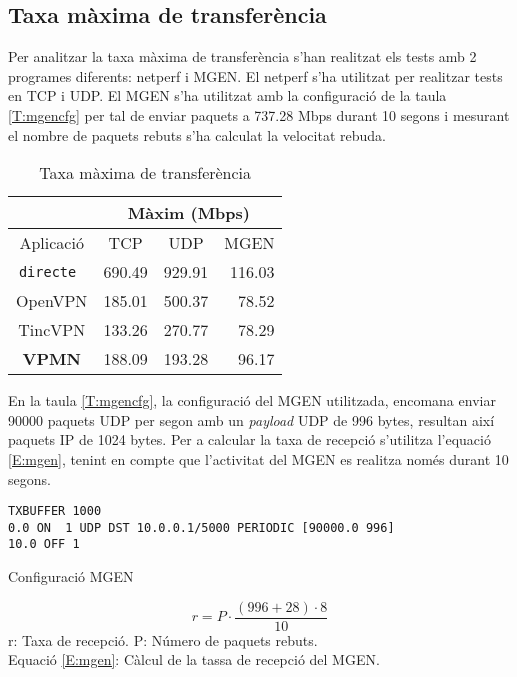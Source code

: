 \subsection{Taxa màxima de transferència}
Per analitzar la taxa màxima de transferència s'han realitzat els tests amb 2 programes diferents: netperf i MGEN.
El netperf s'ha utilitzat per realitzar tests en TCP i UDP.
El MGEN s'ha utilitzat amb la configuració de la taula \ref{T:mgencfg} per tal de enviar paquets a 737.28 Mbps durant 10 segons i mesurant el nombre de paquets rebuts s'ha calculat la velocitat rebuda.
\begin{table}[htb]
\begin{center}
\begin{tabular}{|c|c|c|r|}
\multicolumn{1}{c}{} & \multicolumn{3}{|c|}{Màxim (Mbps)} \\ \hline
Aplicació & TCP & UDP & MGEN \\ \hline \hline
\tt directe & 690.49 & 929.91 & 116.03 \\ \hline
OpenVPN & 185.01 & 500.37 & 78.52 \\ \hline
TincVPN & 133.26 & 270.77 & 78.29 \\ \hline
\bf VPMN & 188.09 & 193.28 & 96.17 \\ \hline
\end{tabular}
\end{center}
\begin{center}
\caption{Taxa màxima de transferència}
\label{T:tax}
\end{center}
\end{table}
En la taula \ref{T:mgencfg}, la configuració del MGEN utilitzada, encomana enviar 90000 paquets UDP per segon amb un \emph{payload} UDP de 996 bytes, resultan així paquets IP de 1024 bytes. Per a calcular la taxa de recepció s'utilitza l'equació \ref{E:mgen}, tenint en compte que l'activitat del MGEN es realitza només durant 10 segons.
\begin{table}[htb]
\begin{center}
\begin{minipage}[htb]{0.6\linewidth}
\footnotesize
\begin{verbatim}
TXBUFFER 1000
0.0 ON  1 UDP DST 10.0.0.1/5000 PERIODIC [90000.0 996]
10.0 OFF 1
\end{verbatim}
\end{minipage}
\caption{Configuració MGEN}
\label{T:mgencfg}
\end{center}
\end{table}
\begin{minipage}[htb]{\linewidth}
\begin{equation}\label{E:mgen}
r=P\cdot\frac{(996+28)\cdot8}{10}
\end{equation}
\centering
{\scriptsize
r: Taxa de recepció. 
P: Número de paquets rebuts. 
}\\
Equació \ref{E:mgen}: Càlcul de la tassa de recepció del MGEN.
\end{minipage}

